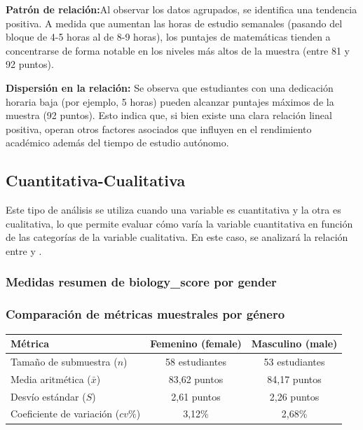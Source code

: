\textbf{Patrón de relación:}Al observar los datos agrupados, se identifica una tendencia positiva. A medida que aumentan las horas de estudio semanales (pasando del bloque de 4-5 horas al de 8-9 horas), los puntajes de matemáticas tienden a concentrarse de forma notable en los niveles más altos de la muestra (entre 81 y 92 puntos).

\textbf{Dispersión en la relación:} Se observa que estudiantes con una dedicación horaria baja (por ejemplo, 5 horas) pueden alcanzar puntajes máximos de la muestra (92 puntos). Esto indica que, si bien existe una clara relación lineal positiva, operan otros factores asociados que influyen en el rendimiento académico además del tiempo de estudio autónomo.
\subsection{Cuantitativa-Cualitativa}
Este tipo de análisis se utiliza cuando una variable es cuantitativa y la otra es cualitativa, lo que permite evaluar cómo varía la variable cuantitativa en función de las categorías de la variable cualitativa. En este caso, se analizará la relación entre  y .

\subsubsection{Medidas resumen de biology\_score por gender}




\subsubsection{Comparación de métricas muestrales por género}
\begin{table}[H]
\centering
\begin{tabular}{lcc}
\toprule
\textbf{Métrica} & \textbf{Femenino (female)} & \textbf{Masculino (male)} \\
\midrule
Tamaño de submuestra ($n$) & 58 estudiantes & 53 estudiantes \\
Media aritmética ($\bar{x}$) & 83,62 puntos & 84,17 puntos \\
Desvío estándar ($S$) & 2,61 puntos & 2,26 puntos \\
Coeficiente de variación ($cv\%$) & 3,12\% & 2,68\% \\
\bottomrule
\end{tabular}
\end{table}

